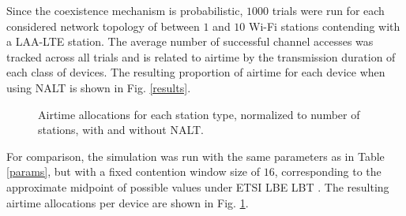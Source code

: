 Since the coexistence mechanism is probabilistic, $1000$ trials were run for each considered network topology of between $1$ and $10$ \mbox{Wi-Fi} stations contending with a \mbox{LAA-LTE} station.  The average number of successful channel accesses was tracked across all trials and is related to airtime by the transmission duration of each class of devices.  The resulting proportion of airtime for each device when using NALT is shown in Fig. \ref{results}.
\begin{figure}[t] %
	\centering
	\hfil
	\caption{Airtime allocations for each station type, normalized to number of stations, with and without NALT.}
	\label{compresults}
\end{figure}
For comparison, the simulation was run with the same parameters as in Table \ref{params}, but with a fixed contention window size of $16$, corresponding to the approximate midpoint of possible values under ETSI LBE LBT \cite{3gpp}. The resulting airtime allocations per device are shown in Fig. \ref{compresults}.

